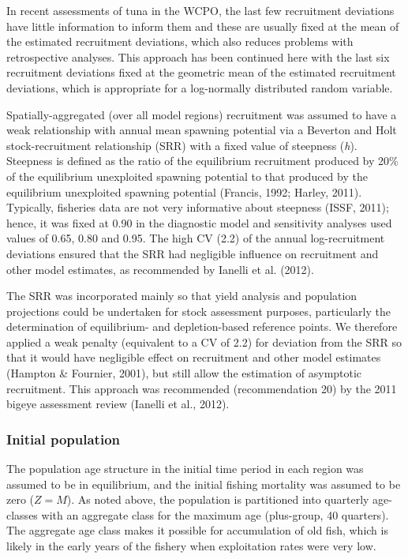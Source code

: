 \documentclass[
  english,
  a4paper,
  a4paper,
  11pt]{SCreport}
\begin{document}
In recent assessments of tuna in the WCPO, the last few recruitment
deviations have little information to inform them and these are usually
fixed at the mean of the estimated recruitment deviations, which also
reduces problems with retrospective analyses. This approach has been
continued here with the last six recruitment deviations fixed at the
geometric mean of the estimated recruitment deviations, which is
appropriate for a log-normally distributed random variable.

Spatially-aggregated (over all model regions) recruitment was assumed to
have a weak relationship with annual mean spawning potential via a
Beverton and Holt stock-recruitment relationship (SRR) with a fixed
value of steepness (\emph{h}). Steepness is defined as the ratio of the
equilibrium recruitment produced by 20\% of the equilibrium unexploited
spawning potential to that produced by the equilibrium unexploited
spawning potential (Francis, 1992; Harley, 2011). Typically, fisheries
data are not very informative about steepness (ISSF, 2011); hence, it
was fixed at 0.90 in the diagnostic model and sensitivity analyses used
values of 0.65, 0.80 and 0.95. The high CV (2.2) of the annual
log-recruitment deviations ensured that the SRR had negligible influence
on recruitment and other model estimates, as recommended by Ianelli et
al. (2012).

The SRR was incorporated mainly so that yield analysis and population
projections could be undertaken for stock assessment purposes,
particularly the determination of equilibrium- and depletion-based
reference points. We therefore applied a weak penalty (equivalent to a
CV of 2.2) for deviation from the SRR so that it would have negligible
effect on recruitment and other model estimates (Hampton \& Fournier,
2001), but still allow the estimation of asymptotic recruitment. This
approach was recommended (recommendation 20) by the 2011 bigeye
assessment review (Ianelli et al., 2012).

\subsubsection{Initial population}\label{sec-model-initial-population}

The population age structure in the initial time period in each region
was assumed to be in equilibrium, and the initial fishing mortality was
assumed to be zero (\(Z=M\)). As noted above, the population is
partitioned into quarterly age-classes with an aggregate class for the
maximum age (plus-group, 40 quarters). The aggregate age class makes it
possible for accumulation of old fish, which is likely in the early
years of the fishery when exploitation rates were very low.
\end{document}
